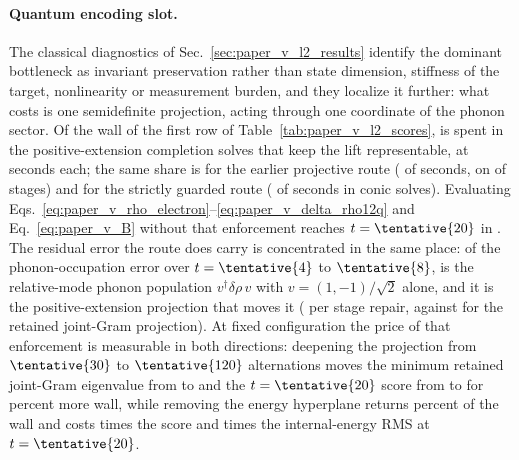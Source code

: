 \paragraph*{Quantum encoding slot.}
The classical diagnostics of Sec.~\ref{sec:paper_v_l2_results} identify the
dominant bottleneck as invariant preservation rather than state dimension,
stiffness of the target, nonlinearity or measurement burden, and they localize
it further: what costs is one semidefinite projection, acting through one
coordinate of the phonon sector.  Of the wall of the first row of
Table~\ref{tab:paper_v_l2_scores},  is spent in the
 positive-extension completion solves that keep the lift
representable, at  seconds each; the same share is
 for the earlier projective route
( of  seconds, on
 of  stages) and
 for the strictly guarded route
( of  seconds in
 conic solves).  Evaluating
Eqs.~\eqref{eq:paper_v_rho_electron}--\eqref{eq:paper_v_delta_rho12q} and
Eq.~\eqref{eq:paper_v_B} without that enforcement reaches \(t=\tentative{20}\)
in .  The residual error the route does carry is
concentrated in the same place: of the phonon-occupation error over
\(t=\tentative{4}\) to \(\tentative{8}\),  is the
relative-mode phonon population \(v^{\dagger}\delta\rho\,v\) with
\(v=(1,-1)/\sqrt{2}\) alone, and it is the positive-extension projection that
moves it ( per stage repair, against
 for the retained joint-Gram projection).  At
fixed configuration the price of that enforcement is measurable in both
directions: deepening the projection from \(\tentative{30}\) to
\(\tentative{120}\) alternations moves the minimum retained joint-Gram
eigenvalue from  to
 and the \(t=\tentative{20}\) score from
 to  for
 percent more wall, while removing the energy hyperplane
returns  percent of the wall and costs 
times the score and  times the internal-energy RMS at
\(t=\tentative{20}\).

